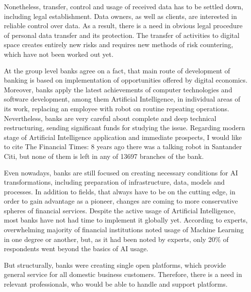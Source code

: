 Nonetheless, transfer, control and usage of received data has to be settled down, including legal establishment.
Data owners, as well as clients, are interested in reliable control over data.
As a result, there is a need in obvious legal procedure of personal data transfer and its protection.
The transfer of activities to digital space creates entirely new risks and requires new methods of risk countering, which have not been worked out yet.

At the group level banks agree on a fact, that main route of development of banking is based on implementation of opportunities offered by digital economics.
Moreover, banks apply the latest achievements of computer technologies and software development, among them Artificial Intelligence, in individual areas of its work, replacing an employee with robot on routine repeating operations.
Nevertheless, banks are very careful about complete and deep technical restructuring, sending significant funds for studying the issue.
Regarding modern stage of Artificial Intelligence application and immediate prospects, I would like to cite The Financial Times:
8 years ago there was a talking robot in Santander Citi, but none of them is left in any of 13697 branches of the bank.
\cite{ai_reality_hype}

Even nowadays, banks are still focused on creating necessary conditions for AI transformations, including preparation of infrastructure, data, models and processes.
In addition to fields, that always have to be on the cutting edge, in order to gain advantage as a pioneer, 
changes are coming to more conservative spheres of financial services.
Despite the active usage of Artificial Intelligence, most banks have not had time to implement it globally yet.
According to experts, overwhelming majority of financial institutions noted usage of Machine Learning in one degree or another, but, as it had been noted by experts, only 20\% of respondents went beyond the basics of AI usage.
\cite{ai_reality_hype}

But structurally, banks were creating single open platforms, which provide general service for all domestic business customers.
Therefore, there is a need in relevant professionals, who would be able to handle and support platforms.

